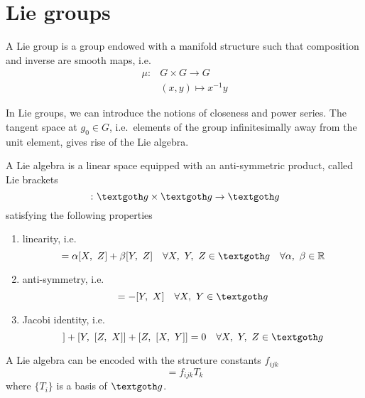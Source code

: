 \chapter{Lie groups}

    \begin{definition}
        A Lie group is a group endowed with a manifold structure such that composition and inverse are smooth maps, i.e.
        \begin{equation*}
        \begin{aligned}
            \mu \colon & G \times G \rightarrow G 
            \\ & (x, y) \mapsto x^{-1} y
        \end{aligned}
        \end{equation*}
    \end{definition}

    In Lie groups, we can introduce the notions of closeness and power series. The tangent space at $g_0 \in G$, i.e.~elements of the group infinitesimally away from the unit element, gives rise of the Lie algebra.

    \begin{definition}
        A Lie algebra is a linear space equipped with an anti-symmetric product, called Lie brackets
        \begin{equation*}
            [~,~] \colon \textgoth g \times \textgoth g \rightarrow \textgoth g
        \end{equation*}
        satisfying the following properties
        \begin{enumerate}
            \item linearity, i.e.
            \begin{equation*}
                [\alpha X + \beta Y, ~Z] = \alpha [X, ~Z] + \beta [Y, ~Z] \quad \forall X, ~Y, ~Z \in \textgoth g \quad \forall \alpha, ~\beta \in \mathbb R
            \end{equation*}
            \item anti-symmetry, i.e.
            \begin{equation*}
                [X, ~Y] = - [Y, ~X] \quad \forall X, ~Y \in \textgoth g
            \end{equation*}
            \item Jacobi identity, i.e.
            \begin{equation*}
                [X, ~[Y, ~Z]] + [Y, ~[Z, ~X]] + [Z, ~[X, ~Y]] = 0 \quad \forall X, ~Y, ~Z \in \textgoth g
            \end{equation*}
        \end{enumerate}
        A Lie algebra can be encoded with the structure constants $f_{ijk}$
        \begin{equation*}
            [T_i, ~T_j] = f_{ijk} T_k
        \end{equation*}
        where $\{T_i\}$ is a basis of $\textgoth g$.
    \end{definition}

